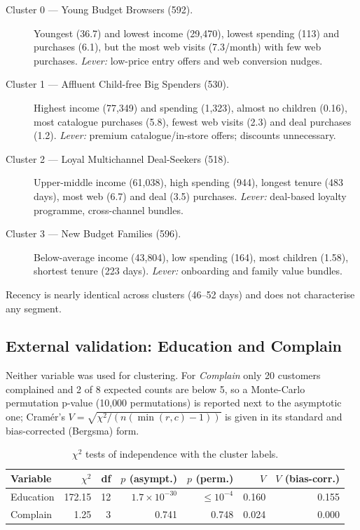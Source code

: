 \documentclass[11pt]{article}
\begin{document}
\begin{description}
\item[Cluster 0 --- Young Budget Browsers (592).] Youngest (36.7) and lowest income (29{,}470),
lowest spending (113) and purchases (6.1), but the most web visits (7.3/month) with few web
purchases. \emph{Lever:} low-price entry offers and web conversion nudges.
\item[Cluster 1 --- Affluent Child-free Big Spenders (530).] Highest income (77{,}349) and spending
(1{,}323), almost no children (0.16), most catalogue purchases (5.8), fewest web visits (2.3) and
deal purchases (1.2). \emph{Lever:} premium catalogue/in-store offers; discounts unnecessary.
\item[Cluster 2 --- Loyal Multichannel Deal-Seekers (518).] Upper-middle income (61{,}038), high
spending (944), longest tenure (483 days), most web (6.7) and deal (3.5) purchases.
\emph{Lever:} deal-based loyalty programme, cross-channel bundles.
\item[Cluster 3 --- New Budget Families (596).] Below-average income (43{,}804), low spending (164),
most children (1.58), shortest tenure (223 days). \emph{Lever:} onboarding and family value bundles.
\end{description}
Recency is nearly identical across clusters (46--52 days) and does not characterise any segment.

\subsection{External validation: Education and Complain}
Neither variable was used for clustering. For \emph{Complain} only 20 customers complained and 2 of
8 expected counts are below 5, so a Monte-Carlo permutation p-value (10{,}000 permutations) is
reported next to the asymptotic one; Cramér's $V=\sqrt{\chi^2/(n(\min(r,c)-1))}$ is given in its
standard and bias-corrected (Bergsma) form.

\begin{table}[H]\centering\small
\caption{$\chi^2$ tests of independence with the cluster labels.}\label{tab:chi}
\begin{tabular}{@{}lrrrrrr@{}}\toprule
Variable & $\chi^2$ & df & $p$ (asympt.) & $p$ (perm.) & $V$ & $V$ (bias-corr.)\\\midrule
Education & 172.15 & 12 & $1.7\times10^{-30}$ & $\le 10^{-4}$ & 0.160 & 0.155\\
Complain & 1.25 & 3 & 0.741 & 0.748 & 0.024 & 0.000\\\bottomrule
\end{tabular}\end{table}
\end{document}
